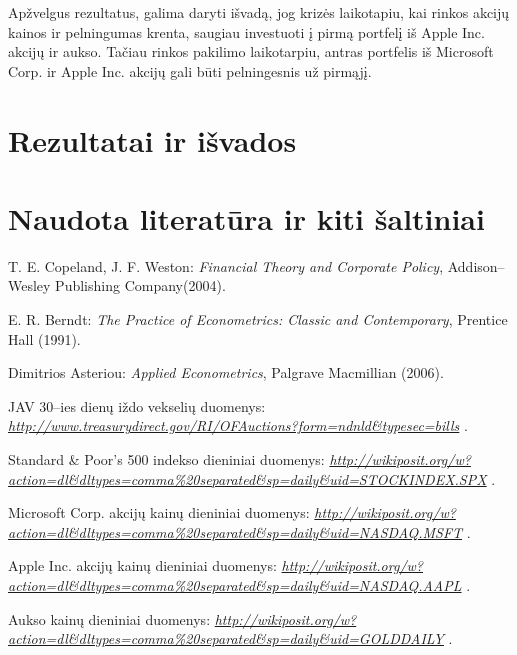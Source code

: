 \documentclass[12pt, a14paper, lithuanian]{article}
\begin{document}
Apžvelgus rezultatus, galima daryti išvadą, jog krizės laikotapiu, kai rinkos akcijų kainos ir pelningumas krenta,
saugiau investuoti į pirmą portfelį iš Apple Inc. akcijų ir aukso. Tačiau rinkos pakilimo laikotarpiu, antras portfelis
iš Microsoft Corp. ir Apple Inc. akcijų gali būti pelningesnis už pirmąjį.


\pagebreak
















\newpage      
\section{Rezultatai ir išvados}
\newpage
\section{Naudota literatūra ir kiti šaltiniai}

\begin{thebibliography}{99}
\label{mySection}
 T. E. Copeland, J. F. Weston:
\emph{Financial Theory and Corporate Policy},
Addison--Wesley Publishing Company(2004).

 E. R. Berndt:
\emph{The Practice of Econometrics: Classic and Contemporary},
Prentice Hall (1991).

 Dimitrios Asteriou:
\emph{Applied Econometrics},
Palgrave Macmillian (2006).

 JAV 30--ies dienų iždo vekselių duomenys:
\emph{ \url{http://www.treasurydirect.gov/RI/OFAuctions?form=ndnld&typesec=bills} }.

 Standard & Poor's 500 indekso dieniniai duomenys:
\emph{ \url{http://wikiposit.org/w?action=dl\&dltypes=comma\%20separated\&sp=daily\&uid=STOCKINDEX.SPX} }.

 Microsoft Corp. akcijų kainų dieniniai duomenys:
\emph{ \url{http://wikiposit.org/w?action=dl\&dltypes=comma\%20separated\&sp=daily\&uid=NASDAQ.MSFT} }.

 Apple Inc. akcijų kainų dieniniai duomenys:
\emph{ \url{http://wikiposit.org/w?action=dl\&dltypes=comma\%20separated\&sp=daily\&uid=NASDAQ.AAPL} }.

 Aukso kainų dieniniai duomenys:
\emph{ \url{http://wikiposit.org/w?action=dl\&dltypes=comma\%20separated\&sp=daily\&uid=GOLDDAILY} }.

\end{thebibliography}
\end{document}
